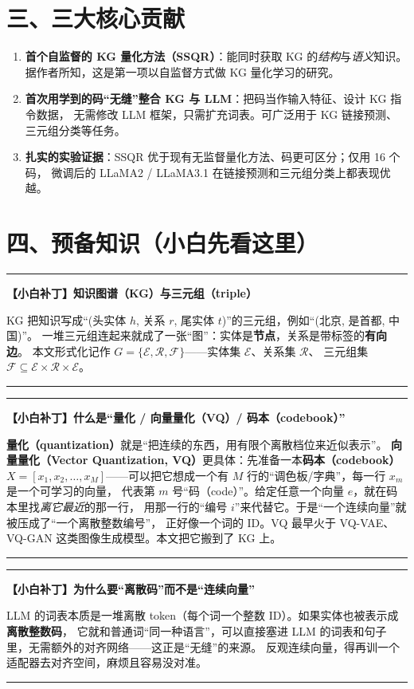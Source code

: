\documentclass[11pt,UTF8,fontset=fandol]{ctexart}
\newenvironment{tip}[1]{%
  \par\smallskip\noindent\rule{\linewidth}{0.4pt}\par\nobreak
  \noindent\textbf{【小白补丁】#1}\par\nobreak\noindent\ignorespaces
}{%
  \par\noindent\rule{\linewidth}{0.4pt}\par\smallskip
}
\begin{document}
\section{三、三大核心贡献}
\begin{enumerate}[leftmargin=2em]
  \item \textbf{首个自监督的 KG 量化方法（SSQR）}：能同时获取 KG 的\emph{结构}与\emph{语义}知识。
        据作者所知，这是第一项以自监督方式做 KG 量化学习的研究。
  \item \textbf{首次用学到的码“无缝”整合 KG 与 LLM}：把码当作输入特征、设计 KG 指令数据，
        无需修改 LLM 框架，只需扩充词表。可广泛用于 KG 链接预测、三元组分类等任务。
  \item \textbf{扎实的实验证据}：SSQR 优于现有无监督量化方法、码更可区分；仅用 16 个码，
        微调后的 LLaMA2 / LLaMA3.1 在链接预测和三元组分类上都表现优越。
\end{enumerate}

\section{四、预备知识（小白先看这里）}

\begin{tip}{知识图谱（KG）与三元组（triple）}
KG 把知识写成“(头实体 $h$, 关系 $r$, 尾实体 $t$)”的三元组，例如“(北京, 是首都, 中国)”。
一堆三元组连起来就成了一张“图”：实体是\textbf{节点}，关系是带标签的\textbf{有向边}。
本文形式化记作 $G=\{\mathcal{E},\mathcal{R},\mathcal{F}\}$——实体集 $\mathcal{E}$、关系集 $\mathcal{R}$、
三元组集 $\mathcal{F}\subseteq \mathcal{E}\times\mathcal{R}\times\mathcal{E}$。
\end{tip}

\begin{tip}{什么是“量化 / 向量量化（VQ）/ 码本（codebook）”}
\textbf{量化（quantization）}就是“把连续的东西，用有限个离散档位来近似表示”。
\textbf{向量量化（Vector Quantization, VQ）}更具体：先准备一本\textbf{码本（codebook）}
$X=[x_1,x_2,\dots,x_M]$——可以把它想成一个有 $M$ 行的“调色板/字典”，每一行 $x_m$ 是一个可学习的向量，
代表第 $m$ 号“码（code）”。给定任意一个向量 $e$，就在码本里找\emph{离它最近}的那一行，
用那一行的“编号 $i$”来代替它。于是“一个连续向量”就被压成了“一个离散整数编号”，
正好像一个词的 ID。VQ 最早火于 VQ-VAE、VQ-GAN 这类图像生成模型。本文把它搬到了 KG 上。
\end{tip}

\begin{tip}{为什么要“离散码”而不是“连续向量”}
LLM 的词表本质是一堆离散 token（每个词一个整数 ID）。如果实体也被表示成\textbf{离散整数码}，
它就和普通词“同一种语言”，可以直接塞进 LLM 的词表和句子里，无需额外的对齐网络——这正是“无缝”的来源。
反观连续向量，得再训一个适配器去对齐空间，麻烦且容易没对准。
\end{tip}
\end{document}
